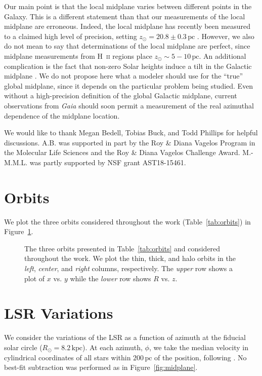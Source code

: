 \documentclass[twocolumn]{aastex62}
\newcommand{\Gus}[1]{\textcolor{red}{#1}}
\newcommand{\pc}{\text{pc}}
\newcommand{\kpc}{\text{kpc}}
\begin{document}
Our main point is that the local midplane varies between different points in
the Galaxy. This is a different statement than that our measurements of the
local midplane are erroneous. Indeed, the local midplane has recently been
measured to a claimed high level of precision, setting $z_{\odot} = 20.8 \pm
0.3\,\pc$ \citep{2019MNRAS.482.1417B}. However, we also do not mean to say
that determinations of the local midplane are perfect, since midplane
measurements from H~\textsc{ii} regions place $z_{\odot} \sim 5-10\,\pc$. An
additional complication is the fact that non-zero Solar heights induce a tilt
in the Galactic midplane \citep{2014ApJ...797...53G,2016ARAA..54..529B}. We do
not propose here what a modeler should use for the ``true'' global midplane,
since it depends on the particular problem being studied. Even without a
high-precision definition of the global Galactic midplane, current
observations from {\em Gaia} should soon permit a measurement of the real
azimuthal dependence of the midplane location.

\acknowledgments
We would like to thank Megan Bedell, Tobias Buck, and Todd Phillips
for helpful discussions. A.B. was supported in part by the Roy \& Diana
Vagelos Program in the Molecular Life Sciences and the Roy \& Diana Vagelos
Challenge Award. 
M.-M.M.L. was partly supported by NSF grant AST18-15461.

\appendix
\section{Orbits} \label{app:orbits}
We plot the three orbits considered throughout the work
(Table~\ref{tab:orbits}) in Figure~\ref{fig:plot_orbits}.

\begin{figure}
\caption{The three orbits presented in Table~\ref{tab:orbits} and considered
throughout the work. We plot the thin, thick, and halo orbits in the {\em
left}, {\em center}, and {\em right} columns, respectively. The {\em upper}
row shows a plot of $x$ vs. $y$ while the {\em lower} row shows $R$ vs. $z$.}
\label{fig:plot_orbits}
\end{figure}

\section{LSR Variations} \label{app:lsr}
We consider the variations of the LSR as a function of azimuth at the fiducial
solar circle ($R_{\odot} = 8.2\,\kpc$). At each azimuth, $\phi$, we take the
median velocity in cylindrical coordinates of all stars within $200\,\pc$ of
the position, following \citet{2018arXiv180610564S}. No best-fit subtraction
was performed as in Figure~\ref{fig:midplane}.
\end{document}
